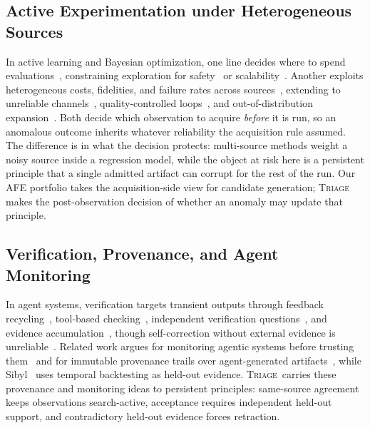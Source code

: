 \documentclass{article}
\newcommand{\triage}{\textsc{Triage}\,}
\begin{document}
\subsection{Active Experimentation under Heterogeneous Sources}
In active learning and Bayesian optimization, one line decides where to spend evaluations~\citep{mackay1992information,houlsby2011bayesianactivelearningclassification}, constraining exploration for safety~\citep{sui2015safeopt} or scalability~\citep{eriksson2019turbo}. Another exploits heterogeneous costs, fidelities, and failure rates across sources~\citep{swersky2013multitask,kandasamy2017multifidelitybayesianoptimisationcontinuous,poloczek2017multiinformation,ghoreishi2018multinformation}, extending to unreliable channels~\citep{mikkola2023multifidelity,fan2024inputdependentmfbo}, quality-controlled loops~\citep{harris2025activeoversightqualitycontrol}, and out-of-distribution expansion~\citep{desanti2026actflow}. Both decide which observation to acquire \emph{before} it is run, so an anomalous outcome inherits whatever reliability the acquisition rule assumed. The difference is in what the decision protects: multi-source methods weight a noisy source inside a regression model, while the object at risk here is a persistent principle that a single admitted artifact can corrupt for the rest of the run. Our AFE portfolio takes the acquisition-side view for candidate generation; \triage{} makes the post-observation decision of whether an anomaly may update that principle.

\subsection{Verification, Provenance, and Agent Monitoring}
In agent systems, verification targets transient outputs through feedback recycling~\citep{yao2023reactsynergizingreasoningacting,shinn2023reflexion,madaan2023selfrefine}, tool-based checking~\citep{gou2023critic}, independent verification questions~\citep{dhuliawala2024chainverification}, and evidence accumulation~\citep{zhang2026glean}, though self-correction without external evidence is unreliable~\citep{huang2023cannotselfcorrect,kamoi2024selfcorrection}. Related work argues for monitoring agentic systems before trusting them~\citep{boston2026monitoring} and for immutable provenance trails over agent-generated artifacts~\citep{liu2026lasthuman}, while Sibyl~\citep{rangelov2026sibyl} uses temporal backtesting as held-out evidence. \triage{} carries these provenance and monitoring ideas to persistent principles: same-source agreement keeps observations search-active, acceptance requires independent held-out support, and contradictory held-out evidence forces retraction.
\end{document}
